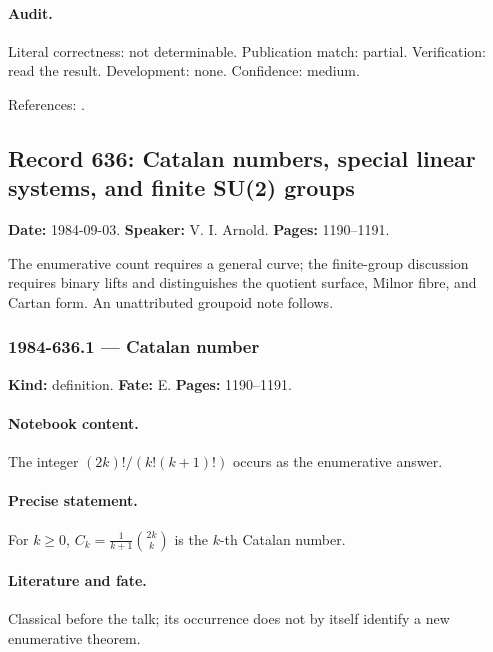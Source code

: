 \paragraph{Audit.} Literal correctness: not determinable. Publication match: partial. Verification: read the result. Development: none. Confidence: medium.

\noindent References: \citep{grothendieck1984esquisse}.\par

\subsection{Record 636: Catalan numbers, special linear systems, and finite SU(2) groups}

\label{talk:636}

\noindent\textbf{Date:} 1984-09-03. \textbf{Speaker:} V. I. Arnold. \textbf{Pages:} 1190--1191.\par

The enumerative count requires a general curve; the finite-group discussion requires binary lifts and distinguishes the quotient surface, Milnor fibre, and Cartan form. An unattributed groupoid note follows.

\subsubsection{1984-636.1 --- Catalan number}

\label{item:1984-636.1}

\noindent\textbf{Kind:} definition. \textbf{Fate:} E. \textbf{Pages:} 1190--1191.\par

\paragraph{Notebook content.} The integer \((2k)!/(k!(k+1)!)\) occurs as the enumerative answer.

\paragraph{Precise statement.} For \(k\ge0\), \(C_k=\frac1{k+1}\binom{2k}{k}\) is the \(k\)-th Catalan number.

\paragraph{Literature and fate.} Classical before the talk; its occurrence does not by itself identify a new enumerative theorem.

